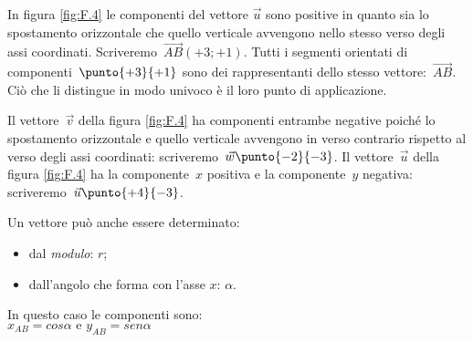 In figura \ref{fig:F.4} le componenti del vettore \(\vec{u}\) sono positive 
in quanto sia lo spostamento orizzontale che quello verticale avvengono nello 
stesso verso degli assi coordinati. 
Scriveremo~$\overrightarrow{AB}(+3;+1)$. 
Tutti i segmenti orientati di componenti~$\punto{+3}{+1}$ sono 
dei rappresentanti dello stesso vettore:~$\overrightarrow{AB}$.
Ciò che li distingue in modo univoco è il loro punto di applicazione.

\begin{esempio}
Il vettore~$\vec{v}$ della figura \ref{fig:F.4} ha componenti entrambe 
negative poiché lo spostamento orizzontale e quello verticale avvengono 
in verso contrario rispetto al verso degli assi coordinati: 
scriveremo~$\vec{w}\punto{-2}{-3}$. 
Il vettore~$\vec{u}$ della figura \ref{fig:F.4} ha la componente~$x$ positiva 
e la componente~$y$ negativa: 
scriveremo~$\vec{u}\punto{+4}{-3}$.
\end{esempio}
% 

\begin{minipage}{.49 \textwidth}
Un vettore può anche essere determinato:
\begin{itemize}
 \item dal \emph{modulo}: \(r\);
 \item dall'angolo che forma con l'asse \(x\): \(\alpha\).
\end{itemize}

In questo caso le componenti sono:\\
\(x_{AB} = cos \alpha \text{ e } y_{AB} = sen \alpha\)  
\end{minipage}
\hfill
\begin{minipage}{.49 \textwidth}
 \begin{inaccessibleblock}
 \begin{center}
  \vettorepolare
 \end{center}
\end{inaccessibleblock}
\end{minipage}


